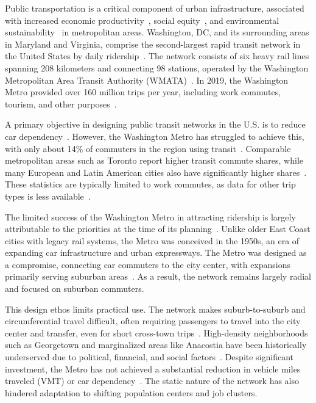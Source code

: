 \documentclass[manuscript,nonacm]{acmart}
\begin{document}
Public transportation is a critical component of urban infrastructure, associated with increased economic productivity~\cite{lit:us_transit_policy}, social equity~\cite{lit:equity}, and environmental sustainability~\cite{lit:us_transit_policy} in metropolitan areas. Washington, DC, and its surrounding areas in Maryland and Virginia, comprise the second-largest rapid transit network in the United States by daily ridership~\cite{lit:wmata_stats}. The network consists of six heavy rail lines spanning 208 kilometers and connecting 98 stations, operated by the Washington Metropolitan Area Transit Authority (WMATA)~\cite{lit:wmata_stats}. In 2019, the Washington Metro provided over 160 million trips per year, including work commutes, tourism, and other purposes~\cite{lit:wmata_stats}.

A primary objective in designing public transit networks in the U.S. is to reduce car dependency~\cite{lit:us_transit_policy}. However, the Washington Metro has struggled to achieve this, with only about 14\% of commuters in the region using transit~\cite{lit:commute_stats}. Comparable metropolitan areas such as Toronto report higher transit commute shares, while many European and Latin American cities also have significantly higher shares~\cite{lit:toronto}. These statistics are typically limited to work commutes, as data for other trip types is less available~\cite{lit:commute_stats}.

The limited success of the Washington Metro in attracting ridership is largely attributable to the priorities at the time of its planning~\cite{lit:wmata_history}. Unlike older East Coast cities with legacy rail systems, the Metro was conceived in the 1950s, an era of expanding car infrastructure and urban expressways. The Metro was designed as a compromise, connecting car commuters to the city center, with expansions primarily serving suburban areas~\cite{lit:wmata_history}. As a result, the network remains largely radial and focused on suburban commuters.

This design ethos limits practical use. The network makes suburb-to-suburb and circumferential travel difficult, often requiring passengers to travel into the city center and transfer, even for short cross-town trips~\cite{lit:wmata_stats}. High-density neighborhoods such as Georgetown and marginalized areas like Anacostia have been historically underserved due to political, financial, and social factors~\cite{lit:equity}. Despite significant investment, the Metro has not achieved a substantial reduction in vehicle miles traveled (VMT) or car dependency~\cite{lit:env}. The static nature of the network has also hindered adaptation to shifting population centers and job clusters.
\end{document}
